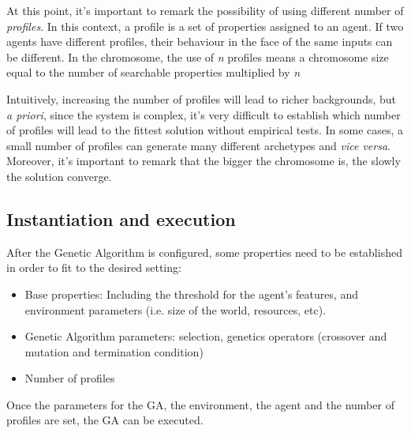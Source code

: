 \documentclass{sig-alternate}
\begin{document}

At this point, it's important to remark the possibility of using different number of {\em profiles}. In this context, a profile is a set of properties assigned to an agent. If two agents have different profiles, their behaviour in the face of the same inputs can be different. In the chromosome, the use of \textit{n} profiles means a chromosome size equal to the number of searchable properties multiplied by \textit{n} 

Intuitively, increasing the number of profiles will lead to richer backgrounds, but \textit{a priori}, since the system is complex, it's very difficult to establish which number of profiles will lead to the fittest solution without empirical tests. In some cases, a small number of profiles can generate many different archetypes and \textit{vice versa}. Moreover, it's important to remark that the bigger the chromosome is, the slowly the solution converge.


\subsection{Instantiation and execution}

After the Genetic Algorithm is configured, some properties need to be established in order to fit to the desired setting:
\begin{itemize}
\item Base properties: Including the threshold for the agent's features, and environment parameters (i.e. size of the world, resources, etc).
\item Genetic Algorithm parameters: selection, genetics operators (crossover and mutation and termination condition)
\item Number of profiles
\end{itemize}

Once the parameters for the GA, the environment, the agent and the number of profiles are set, the GA can be executed.
\end{document}

